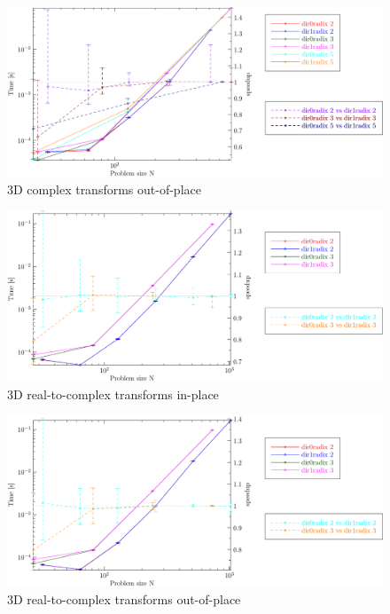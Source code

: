 \documentclass[12pt]{article}
\begin{document}
\centering
\begin{figure}[htbp]
   \includegraphics[width=\textwidth]{3d_c2coutofplace_double.pdf}
   \caption{3D complex transforms out-of-place}
\end{figure}

\centering
\begin{figure}[htbp]
   \includegraphics[width=\textwidth]{3d_r2cinplace_double.pdf}
   \caption{3D real-to-complex transforms in-place}
\end{figure}
\clearpage

\centering
\begin{figure}[htbp]
   \includegraphics[width=\textwidth]{3d_r2coutofplace_double.pdf}
   \caption{3D real-to-complex transforms out-of-place}
\end{figure}
\end{document}
